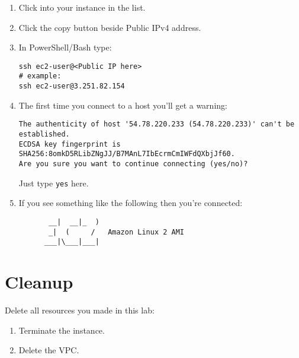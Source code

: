 \begin{enumerate}
\item Click into your instance in the list.

\item Click the copy button beside Public IPv4 address.

\item In PowerShell/Bash type:
\begin{verbatim}
ssh ec2-user@<Public IP here>
# example:
ssh ec2-user@3.251.82.154
\end{verbatim}

\item
The first time you connect to a host you'll get a warning:

\begin{verbatim}
The authenticity of host '54.78.220.233 (54.78.220.233)' can't be established.
ECDSA key fingerprint is SHA256:8omkD5RLibZNgJJ/B7MAnL7IbEcrmCmIWFdQXbjJf60.
Are you sure you want to continue connecting (yes/no)?
\end{verbatim}

Just type \texttt{yes} here.

\item 
If you see something like the following then you're connected:

\begin{verbatim}
       __|  __|_  )
       _|  (     /   Amazon Linux 2 AMI
      ___|\___|___|
\end{verbatim}

\end{enumerate}

\section{Cleanup}

Delete all resources you made in this lab:
\begin{enumerate}
\item Terminate the instance.
\item Delete the VPC.
\end{enumerate}

